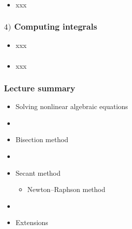 \documentclass[english,14pt]{beamer}
\begin{document}

\begin{frame}[fragile]

\frametitle{}

\begin{itemize}
	\item xxx
\end{itemize}

\end{frame}


\begin{frame}[fragile]

\frametitle{$4)$ Computing integrals}

\begin{itemize}
	\item xxx
\end{itemize}

\end{frame}


\begin{frame}[fragile]

\frametitle{}

\begin{itemize}
	\item xxx
\end{itemize}

\end{frame}


\begin{frame}[fragile]

\frametitle{Lecture summary}
\begin{itemize}
	\item Solving nonlinear algebraic equations

	\item[]
	
	\item Bisection method

	\item[]
	
	\item Secant method
	\begin{itemize}
		\item Newton--Raphson method
	\end{itemize}

	\item[]
	
	\item Extensions
	
\end{itemize}

\end{frame}
\end{document}
